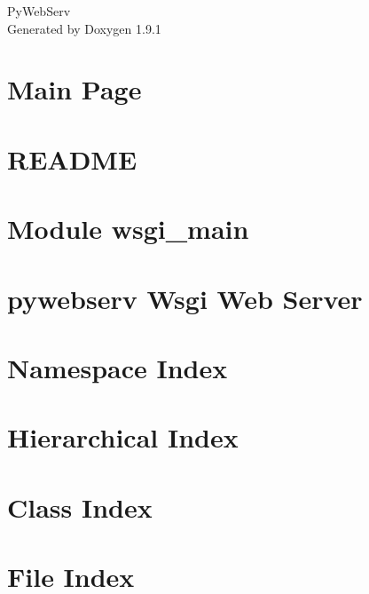 \let\mypdfximage\pdfximage\def\pdfximage{\immediate\mypdfximage}\documentclass[twoside]{book}
\newcommand{\+}{\discretionary{\mbox{\scriptsize$\hookleftarrow$}}{}{}}
\newcommand{\clearemptydoublepage}{%
  \newpage{\pagestyle{empty}\cleardoublepage}%
}
\begin{document}
\raggedbottom

\hypersetup{pageanchor=false,
             bookmarksnumbered=true,
             pdfencoding=unicode
            }
\begin{titlepage}
\vspace*{7cm}
\begin{center}%
{\Large Py\+Web\+Serv }\\
\vspace*{1cm}
{\large Generated by Doxygen 1.9.1}\\
\end{center}
\end{titlepage}
\clearemptydoublepage
{}
\tableofcontents
\clearemptydoublepage
{}
\hypersetup{pageanchor=true}

\chapter{Main Page}
\label{index}\hypertarget{index}{}
\chapter{README}
\label{md_content_README}

\chapter{Module wsgi\+\_\+main}
\label{md_doc3_wsgi_main}

\chapter{pywebserv Wsgi Web Server}
\label{md_README}

\chapter{Namespace Index}

\chapter{Hierarchical Index}

\chapter{Class Index}

\chapter{File Index}

\end{document}
